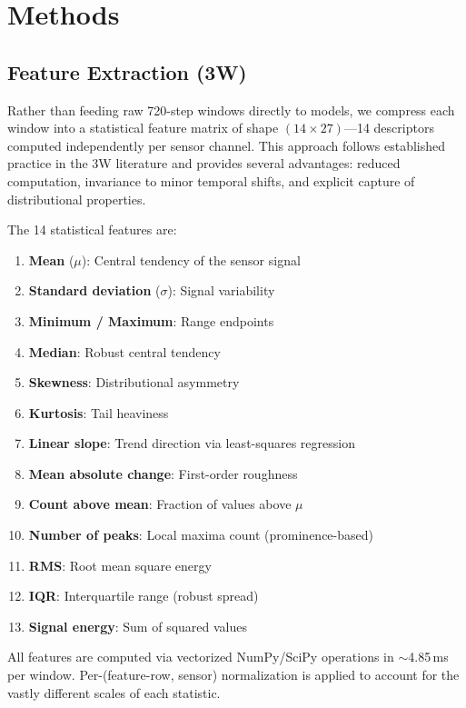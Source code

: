 \documentclass[conference]{IEEEtran}
\begin{document}
\section{Methods}
\label{sec:methods}

\subsection{Feature Extraction (3W)}
\label{sec:features}

Rather than feeding raw 720-step windows directly to models, we compress each window into a statistical feature matrix of shape $(14 \times 27)$---14 descriptors computed independently per sensor channel. This approach follows established practice in the 3W literature and provides several advantages: reduced computation, invariance to minor temporal shifts, and explicit capture of distributional properties.

The 14 statistical features are:
\begin{enumerate}
    \setlength{\itemsep}{0pt}
    \item \textbf{Mean} ($\mu$): Central tendency of the sensor signal
    \item \textbf{Standard deviation} ($\sigma$): Signal variability
    \item \textbf{Minimum / Maximum}: Range endpoints
    \item \textbf{Median}: Robust central tendency
    \item \textbf{Skewness}: Distributional asymmetry
    \item \textbf{Kurtosis}: Tail heaviness
    \item \textbf{Linear slope}: Trend direction via least-squares regression
    \item \textbf{Mean absolute change}: First-order roughness
    \item \textbf{Count above mean}: Fraction of values above $\mu$
    \item \textbf{Number of peaks}: Local maxima count (prominence-based)
    \item \textbf{RMS}: Root mean square energy
    \item \textbf{IQR}: Interquartile range (robust spread)
    \item \textbf{Signal energy}: Sum of squared values
\end{enumerate}

\noindent All features are computed via vectorized NumPy/SciPy operations in $\sim$4.85\,ms per window. Per-(feature-row, sensor) normalization is applied to account for the vastly different scales of each statistic.
\end{document}
